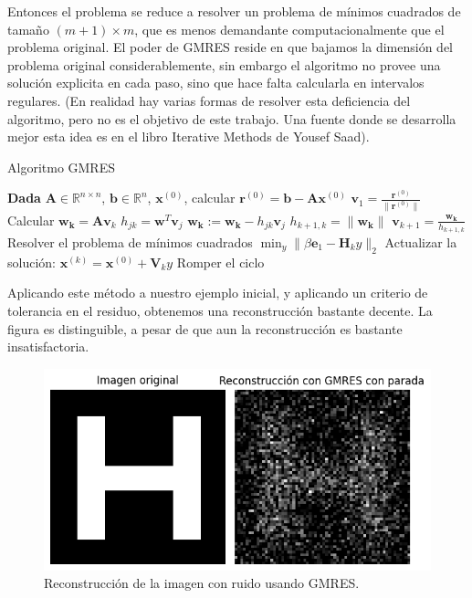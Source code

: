 \documentclass[12pt, oneside]{book}
\begin{document}
	Entonces el problema se reduce a resolver un problema de mínimos cuadrados de tamaño $(m+1)\times m$, que es menos demandante computacionalmente que el problema original. El poder de GMRES reside en que bajamos la dimensión del problema original considerablemente, sin embargo el algoritmo no provee una solución explicita en cada paso, sino que hace falta calcularla en intervalos regulares. (En realidad hay varias formas de resolver esta deficiencia del algoritmo, pero no es el objetivo de este trabajo. Una fuente donde se desarrolla mejor esta idea es en el libro Iterative Methods de Yousef Saad).
	
	\begin{algorithm}
		\caption{Algoritmo GMRES}
		\begin{algorithmic}[1]
			\STATE \textbf{Dada} $\mathbf{A} \in \mathbb{R}^{n \times n}$, $\mathbf{b} \in \mathbb{R}^n$, $\mathbf{x}^{(0)}$, calcular $\mathbf{r}^{(0)} = \mathbf{b} - \mathbf{A} \mathbf{x}^{(0)}$
			\STATE $\mathbf{v}_1 = \frac{\mathbf{r}^{(0)}}{\|\mathbf{r}^{(0)}\|}$
			\STATE Calcular $\mathbf{w_k} = \mathbf{A} \mathbf{v}_k$
			\STATE $h_{jk} = \mathbf{w}^T \mathbf{v}_j$
			\STATE $\mathbf{w_k} := \mathbf{w_k} - h_{jk} \mathbf{v}_j$
			\ENDFOR
			\STATE $h_{k+1,k} = \|\mathbf{w_k}\|$
			\STATE $\mathbf{v}_{k+1} = \frac{\mathbf{w_k}}{h_{k+1,k}}$
			\ENDIF
			\ENDFOR
			\STATE Resolver el problema de mínimos cuadrados $\min_y \|\beta \mathbf{e}_1 - \mathbf{H}_k y\|_2$
			\STATE Actualizar la solución: $\mathbf{x}^{(k)} = \mathbf{x}^{(0)} + \mathbf{V}_k y$
			\STATE Romper el ciclo
			\ENDIF
		\end{algorithmic}
	\end{algorithm}
	
	Aplicando este método a nuestro ejemplo inicial, y aplicando un criterio de tolerancia en el residuo, obtenemos una reconstrucción bastante decente. La figura es distinguible, a pesar de que aun la reconstrucción es bastante insatisfactoria.
	\begin{figure}[H]
		\centering
		\includegraphics[scale=0.5]{Imagenes/H_GMRES.png}
		\caption{Reconstrucción de la imagen con ruido usando GMRES.\\}
	\end{figure}
	
\end{document}
